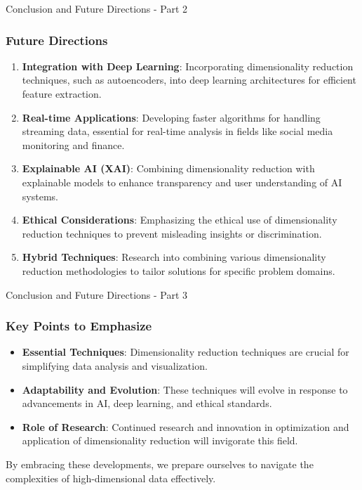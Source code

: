 \documentclass[aspectratio=169]{beamer}
\begin{document}
\begin{frame}[fragile]{Conclusion and Future Directions - Part 2}
    \frametitle{Future Directions}
    
    \begin{enumerate}
        \item \textbf{Integration with Deep Learning}:
        Incorporating dimensionality reduction techniques, such as autoencoders, into deep learning architectures for efficient feature extraction.
        
        \item \textbf{Real-time Applications}:
        Developing faster algorithms for handling streaming data, essential for real-time analysis in fields like social media monitoring and finance.
        
        \item \textbf{Explainable AI (XAI)}:
        Combining dimensionality reduction with explainable models to enhance transparency and user understanding of AI systems.
        
        \item \textbf{Ethical Considerations}:
        Emphasizing the ethical use of dimensionality reduction techniques to prevent misleading insights or discrimination.
        
        \item \textbf{Hybrid Techniques}:
        Research into combining various dimensionality reduction methodologies to tailor solutions for specific problem domains.
    \end{enumerate}
\end{frame}

\begin{frame}[fragile]{Conclusion and Future Directions - Part 3}
    \frametitle{Key Points to Emphasize}
    
    \begin{itemize}
        \item \textbf{Essential Techniques}: Dimensionality reduction techniques are crucial for simplifying data analysis and visualization.
        
        \item \textbf{Adaptability and Evolution}: These techniques will evolve in response to advancements in AI, deep learning, and ethical standards.
        
        \item \textbf{Role of Research}: Continued research and innovation in optimization and application of dimensionality reduction will invigorate this field.
    \end{itemize}
    
    By embracing these developments, we prepare ourselves to navigate the complexities of high-dimensional data effectively.
\end{frame}
\end{document}
